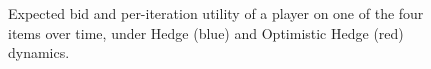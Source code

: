 \documentclass[a4paper]{article}
\theoremstyle{definition}
\begin{document}
\begin{figure}[htbp]
\centering
{}
\quad
{}
\caption{Expected bid and per-iteration utility of a player on one of
  the four items over time, under Hedge (blue) and {Optimistic Hedge}
  (red) dynamics.}\label{fig:bids}
\end{figure}
\clearpage
{}


\printbibliography
\end{document}
